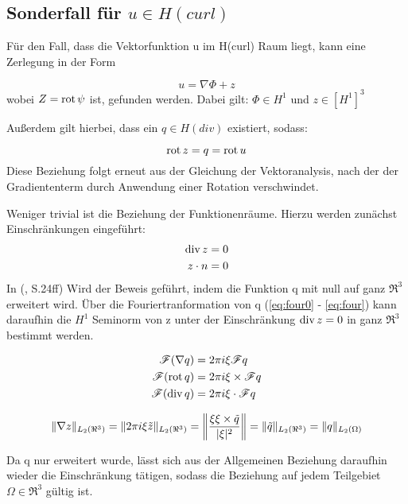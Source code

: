 \subsection{Sonderfall f\"ur $u\in H(curl)$}
F\"ur den Fall, dass die Vektorfunktion u im H(curl) Raum liegt, kann eine Zerlegung in der Form \par
\begin{equation}
	u = \nabla\Phi + z
\end{equation}
wobei $Z = \mathrm{rot}\, \psi$ ist, gefunden werden.
Dabei gilt: $\Phi\in H^1$ und $z\in [H^1]^3$\par
Au\ss{}erdem gilt hierbei, dass ein $q\in H(div)$ existiert, sodass:\par
\begin{equation}
	\mathrm{rot}\, z = q = \mathrm{rot}\, u
	\label{eq:qdef}
\end{equation}
Diese Beziehung folgt erneut aus der Gleichung der Vektoranalysis, nach der der Gradiententerm durch Anwendung einer Rotation verschwindet.
\par
Weniger trivial ist die Beziehung der Funktionenr\"aume. Hierzu werden zun\"achst Einschr\"ankungen eingef\"uhrt:
\begin{align}
	\mathrm{div}\, z &= 0\\
	z\cdot n &= 0
\end{align}
In (\cite{Schberl2009NumericalMF}, S.24ff) Wird der Beweis gef\"uhrt, indem die Funktion q mit null auf ganz $\Re^3$ erweitert wird. \"Uber die Fouriertranformation von q (\ref{eq:four0} - \ref{eq:four}) kann daraufhin die $H^1$ Seminorm von z unter der Einschr\"ankung $\mathrm{div}\, z =0$ in ganz $\Re^3$ bestimmt werden.
\par
\begin{align}
	\mathcal{F}(\nabla q) &= 2\pi i\xi\mathcal{F}q \label{eq:four0}\\
	\mathcal{F}(\mathrm{rot}\, q) &= 2\pi i\xi\times\mathcal{F}q \\
	\mathcal{F}(\mathrm{div}\, q) &= 2\pi i\xi\cdot\mathcal{F}q
	\label{eq:four}
\end{align}
\par
\begin{equation}
	\|\nabla z\|_{L_2(\Re^3)} = \|2\pi i \xi \tilde{z}\|_{L_2(\Re^3)} = \bigg{\|}\frac{\xi\xi\times\tilde{q}}{|\xi|^2}\bigg{\|} = \|\tilde{q}\|_{L_2(\Re^3)} = \|q\|_{L_2(\Omega)}
\end{equation}

Da q nur erweitert wurde, l\"asst sich aus der Allgemeinen Beziehung daraufhin wieder die Einschr\"ankung t\"atigen, sodass die Beziehung auf jedem Teilgebiet $\Omega\in \Re^3$ g\"ultig ist.